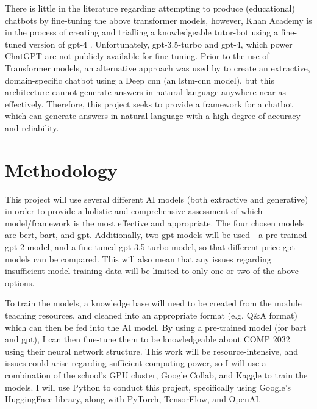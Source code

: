 \documentclass{article}
\begin{document}
There is little in the literature regarding attempting to produce (educational) chatbots by fine-tuning the above transformer models, however, Khan Academy is in the process of creating and trialling a knowledgeable tutor-bot using a fine-tuned version of \acrshort{gpt}-4 \citep{khanAcademy}. Unfortunately, \acrshort{gpt}-3.5-turbo and \acrshort{gpt}-4, which power ChatGPT \citep{ChatGPTrelease} are not publicly available for fine-tuning. Prior to the use of Transformer models, an alternative approach was used by \citet{Chen22} to create an extractive, domain-specific chatbot using a Deep \acrlong{cnn} (an \acrshort{lstm}-\acrshort{cnn} model), but this architecture cannot generate answers in natural language anywhere near as effectively. Therefore, this project seeks to provide a framework for a chatbot which can generate answers in natural language with a high degree of accuracy and reliability.

\section{Methodology}
This project will use several different AI models (both extractive and generative) in order to provide a holistic and comprehensive assessment of which model/framework is the most effective and appropriate. The four chosen models are \acrshort{bert}, \acrshort{bart}, and \acrshort{gpt}. Additionally, two \acrshort{gpt} models will be used - a pre-trained \acrshort{gpt}-2 model, and a fine-tuned \acrshort{gpt}-3.5-turbo model, so that different price \acrshort{gpt} models can be compared. This will also mean that any issues regarding insufficient model training data will be limited to only one or two of the above options.

To train the models, a knowledge base will need to be created from the module teaching resources, and cleaned into an appropriate format (e.g. Q\&A format) which can then be fed into the AI model. By using a pre-trained model (for \acrshort{bart} and \acrshort{gpt}), I can then fine-tune them to be knowledgeable about COMP 2032 using their neural network structure. This work will be resource-intensive, and issues could arise regarding sufficient computing power, so I will use a combination of the school's GPU cluster, Google Collab, and Kaggle to train the models. I will use Python to conduct this project, specifically using Google's HuggingFace library, along with PyTorch, TensorFlow, and OpenAI. 
\end{document}
